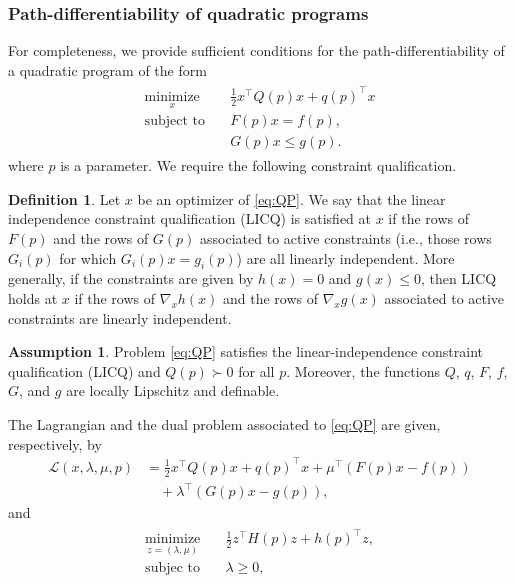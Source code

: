 \documentclass[journal,twoside,web,final]{ieeecolor}
\theoremstyle{definition}
\newtheorem{definition}{Definition}
\newtheorem{assumption}{Assumption}
\begin{document}
\subsubsection{Path-differentiability of quadratic programs} \label{section:path_diff_qp}

For completeness, we provide sufficient conditions for the path-differentiability of a quadratic program of the form
\begin{align}
\begin{split}
\operatorname*{minimize}_x & \quad \frac{1}{2} x^\top Q(p) x + q(p)^\top x \\
\text{subject to} & \quad F(p)x = f(p),\\
& \quad G(p)x \leq g(p).
\end{split} \label{eq:QP}
\end{align}
where $p$ is a parameter. We require the following constraint qualification.
\begin{definition}\label{def:LICQ}
Let $x$ be an optimizer of \cref{eq:QP}. We say that the linear independence constraint qualification (LICQ) is satisfied at $x$ if the rows of $F(p)$ and the rows of $G(p)$ associated to active constraints (i.e., those rows $G_i(p)$ for which $G_i(p)x=g_i(p)$) are all linearly independent. More generally, if the constraints are given by $h(x)=0$ and $g(x) \leq 0$, then LICQ holds at $x$ if the rows of $\nabla_x h(x)$ and the rows of $\nabla_x g(x)$ associated to active constraints are linearly independent.
\end{definition}
%
\begin{assumption}\label{ass:qp}
Problem \cref{eq:QP} satisfies the linear-independence constraint qualification (LICQ) and $Q(p) \succ 0$ for all $p$. Moreover, the functions $Q$, $q$, $F$, $f$, $G$, and $g$ are locally Lipschitz and definable.
\end{assumption}
The Lagrangian and the dual problem associated to \cref{eq:QP} are given, respectively, by
\begin{align*}
\mathcal{L}(x,\lambda,\mu,p) & = \frac{1}{2} x^\top Q(p) x + q(p)^\top x + \mu^\top(F(p)x-f(p)) \\ & \quad + \lambda^\top (G(p)x-g(p)),
\end{align*}
and
\begin{align}
\begin{split}
\operatorname*{minimize}_{z=(\lambda,\mu)} & \quad \frac{1}{2} z^\top H(p) z + h(p)^\top z,\\
\text{subjec to} & \quad \lambda \geq 0,
\end{split} \label{eq:QP_dual}
\end{align}
\end{document}
